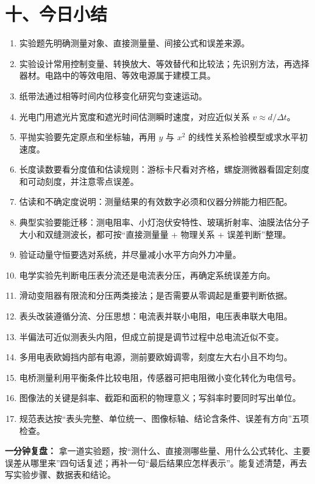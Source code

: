 \section*{十、今日小结}
\begin{enumerate}
  \item 实验题先明确测量对象、直接测量量、间接公式和误差来源。
  \item 实验设计常用控制变量、转换放大、等效替代和比较法；先识别方法，再选择器材。电路中的等效电阻、等效电源属于建模工具。
  \item 纸带法通过相等时间内位移变化研究匀变速运动。
  \item 光电门用遮光片宽度和遮光时间估测瞬时速度，对应近似关系 $v\approx d/\Delta t$。
  \item 平抛实验要先定原点和坐标轴，再用 $y$ 与 $x^2$ 的线性关系检验模型或求水平初速度。
  \item 长度读数要看分度值和估读规则：游标卡尺看对齐格，螺旋测微器看固定刻度和可动刻度，并注意零点误差。
  \item 估读和不确定度说明：测量结果的有效数字必须和仪器分辨能力相匹配。
  \item 典型实验要能迁移：测电阻率、小灯泡伏安特性、玻璃折射率、油膜法估分子大小和双缝测波长，都可按“直接测量量 + 物理关系 + 误差判断”整理。
  \item 验证动量守恒要选对系统，并尽量减小水平方向外力冲量。
  \item 电学实验先判断电压表分流还是电流表分压，再确定系统误差方向。
  \item 滑动变阻器有限流和分压两类接法；是否需要从零调起是重要判断依据。
  \item 表头改装遵循分流、分压思想：电流表并联小电阻，电压表串联大电阻。
  \item 半偏法可近似测表头内阻，但成立前提是调节过程中总电流近似不变。
  \item 多用电表欧姆挡内部有电源，测前要欧姆调零，刻度左大右小且不均匀。
  \item 电桥测量利用平衡条件比较电阻，传感器可把电阻微小变化转化为电信号。
  \item 图像法的关键是斜率、截距和面积的物理意义；写斜率时要同时写出单位。
  \item 规范表达按“表头完整、单位统一、图像标轴、结论含条件、误差有方向”五项检查。
\end{enumerate}

\textbf{一分钟复盘：} 拿一道实验题，按“测什么、直接测哪些量、用什么公式转化、主要误差从哪里来”四句话复述；再补一句“最后结果应怎样表示”。能复述清楚，再去写实验步骤、数据表和结论。
